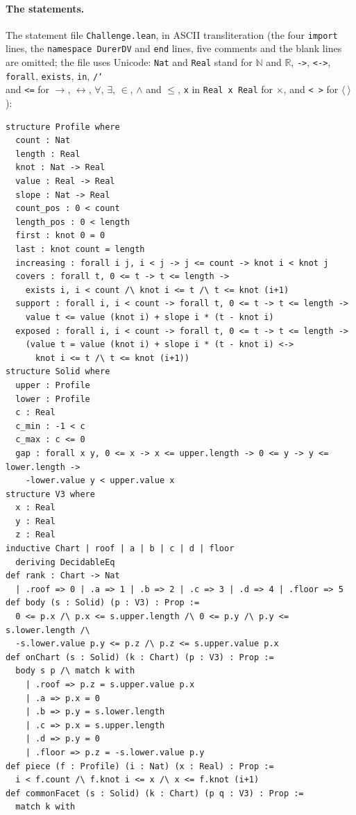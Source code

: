\documentclass[11pt]{article}
\theoremstyle{definition}
\theoremstyle{remark}
\newcommand{\R}{\mathbb R}
\begin{document}
\paragraph{The statements.} The statement file \texttt{Challenge.lean}, in
ASCII transliteration (the four \texttt{import} lines, the
\texttt{namespace DurerDV} and \texttt{end} lines, five comments and the
blank lines are omitted; the file uses Unicode: \texttt{Nat} and
\texttt{Real} stand for $\mathbb N$ and $\R$, \texttt{->}, \texttt{<->},
\texttt{forall}, \texttt{exists}, \texttt{in}, \texttt{/\char`\\} and
\texttt{<=} for $\to$, $\leftrightarrow$, $\forall$, $\exists$, $\in$,
$\wedge$ and $\le$, \texttt{x} in \texttt{Real x Real} for $\times$, and
\texttt{<\ >} for $\langle\ \rangle$):
{\scriptsize
\begin{verbatim}
structure Profile where
  count : Nat
  length : Real
  knot : Nat -> Real
  value : Real -> Real
  slope : Nat -> Real
  count_pos : 0 < count
  length_pos : 0 < length
  first : knot 0 = 0
  last : knot count = length
  increasing : forall i j, i < j -> j <= count -> knot i < knot j
  covers : forall t, 0 <= t -> t <= length ->
    exists i, i < count /\ knot i <= t /\ t <= knot (i+1)
  support : forall i, i < count -> forall t, 0 <= t -> t <= length ->
    value t <= value (knot i) + slope i * (t - knot i)
  exposed : forall i, i < count -> forall t, 0 <= t -> t <= length ->
    (value t = value (knot i) + slope i * (t - knot i) <->
      knot i <= t /\ t <= knot (i+1))
structure Solid where
  upper : Profile
  lower : Profile
  c : Real
  c_min : -1 < c
  c_max : c <= 0
  gap : forall x y, 0 <= x -> x <= upper.length -> 0 <= y -> y <= lower.length ->
    -lower.value y < upper.value x
structure V3 where
  x : Real
  y : Real
  z : Real
inductive Chart | roof | a | b | c | d | floor
  deriving DecidableEq
def rank : Chart -> Nat
  | .roof => 0 | .a => 1 | .b => 2 | .c => 3 | .d => 4 | .floor => 5
def body (s : Solid) (p : V3) : Prop :=
  0 <= p.x /\ p.x <= s.upper.length /\ 0 <= p.y /\ p.y <= s.lower.length /\
  -s.lower.value p.y <= p.z /\ p.z <= s.upper.value p.x
def onChart (s : Solid) (k : Chart) (p : V3) : Prop :=
  body s p /\ match k with
    | .roof => p.z = s.upper.value p.x
    | .a => p.x = 0
    | .b => p.y = s.lower.length
    | .c => p.x = s.upper.length
    | .d => p.y = 0
    | .floor => p.z = -s.lower.value p.y
def piece (f : Profile) (i : Nat) (x : Real) : Prop :=
  i < f.count /\ f.knot i <= x /\ x <= f.knot (i+1)
def commonFacet (s : Solid) (k : Chart) (p q : V3) : Prop :=
  match k with

\end{verbatim}}
\end{document}
